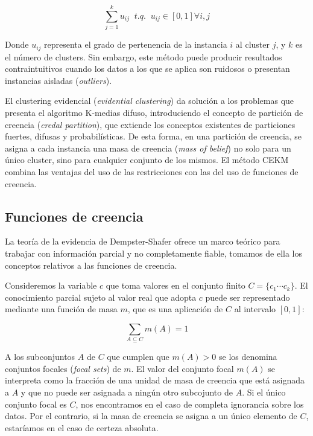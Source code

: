 \begin{equation}
\sum_{j=1}^{k} u_{ij} \;\; t.q. \;\; u_{ij} \in [0,1] \forall i,j
\label{eqn2}
\end{equation}

Donde $u_{ij}$ representa el grado de pertenencia de la instancia $i$ al cluster $j$, y $k$ es el número de clusters. Sin embargo, este método puede producir resultados contraintuitivos cuando los datos a los que se aplica son ruidosos o presentan instancias aisladas (\textit{outliers}).

El clustering evidencial (\textit{evidential clustering}) da solución a los problemas que presenta el algoritmo K-medias difuso, introduciendo el concepto de partición de creencia (\textit{credal partition}), que extiende los conceptos existentes de particiones fuertes, difusas y probabilísticas. De esta forma, en una partición de creencia, se asigna a cada instancia una masa de creencia (\textit{mass of belief}) no solo para un único cluster, sino para cualquier conjunto de los mismos. El método \acs{CEKM} combina las ventajas del uso de las restricciones con las del uso de funciones de creencia.

\subsection{Funciones de creencia}

La teoría de la evidencia de Dempster-Shafer ofrece un marco teórico para trabajar con información parcial y no completamente fiable, tomamos de ella los conceptos relativos a las funciones de creencia.

Consideremos la variable $c$ que toma valores en el conjunto finito $C = \{c_1 \cdots c_k \}$. El conocimiento parcial sujeto al valor real que adopta $c$ puede ser representado mediante una función de masa $m$, que es una aplicación de $C$ al intervalo $[0,1]$:

\begin{equation}
\sum_{A \subseteq C} m(A) = 1
\label{eqn3}
\end{equation}

A los subconjuntos $A$ de $C$ que cumplen que $m(A) > 0$ se los denomina conjuntos focales (\textit{focal sets}) de $m$. El valor del conjunto focal $m(A)$ se interpreta como la fracción de una unidad de masa de creencia que está asignada a $A$ y que no puede ser asignada a ningún otro subcojunto de $A$. Si el único conjunto focal es $C$, nos encontramos en el caso de completa ignorancia sobre los datos. Por el contrario, si la masa de creencia se asigna a un único elemento de $C$, estaríamos en el caso de certeza absoluta.

